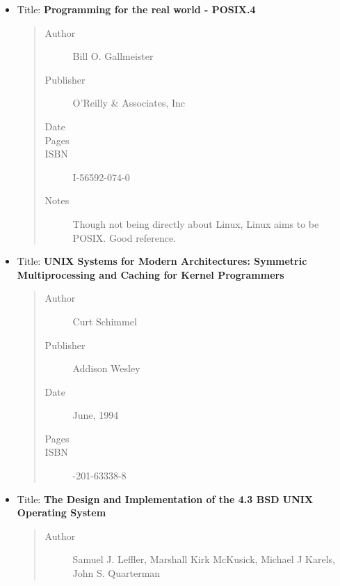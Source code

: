 \documentclass[a4paper,8pt,english]{sphinxmanual}
\begin{document}
\begin{itemize}
\item {} 
Title: \textbf{Programming for the real world - POSIX.4}
\begin{quote}\begin{description}
\item[{Author}] \leavevmode
Bill O. Gallmeister

\item[{Publisher}] \leavevmode
O'Reilly \& Associates, Inc

\item[{Date}] 

\item[{Pages}] 

\item[{ISBN}] \leavevmode
I-56592-074-0

\item[{Notes}] \leavevmode
Though not being directly about Linux, Linux aims to be
POSIX. Good reference.

\end{description}\end{quote}

\item {} 
Title:  \textbf{UNIX  Systems  for  Modern Architectures: Symmetric Multiprocessing and Caching for Kernel Programmers}
\begin{quote}\begin{description}
\item[{Author}] \leavevmode
Curt Schimmel

\item[{Publisher}] \leavevmode
Addison Wesley

\item[{Date}] \leavevmode
June, 1994

\item[{Pages}] 

\item[{ISBN}] -201-63338-8

\end{description}\end{quote}

\item {} 
Title: \textbf{The Design and Implementation of the 4.3 BSD UNIX Operating System}
\begin{quote}\begin{description}
\item[{Author}] \leavevmode
Samuel J. Leffler, Marshall Kirk McKusick, Michael J
Karels, John S. Quarterman


\end{description}
\end{quote}
\end{itemize}
\end{document}
